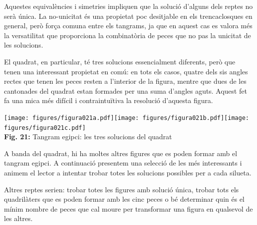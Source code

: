 \documentclass[a4paper,11pt]{article}
\begin{document}
\begin{multicols}{2}
            Aquestes equivalències i simetries impliquen que la solució d'alguns dels reptes no serà única. La no-unicitat és una propietat poc desitjable en els trencaclosques en general, però força comuna entre els tangrams, ja que en aquest cas es valora més la versatilitat que proporciona la combinatòria de peces que no pas la unicitat de les solucions.

            El quadrat, en particular, té tres solucions essencialment diferents, però que tenen una interessant propietat en comú: en tots els casos, quatre dels sis angles rectes que tenen les peces resten a l'interior de la figura, mentre que dues de les cantonades del quadrat estan formades per una suma d'angles aguts. Aquest fet fa una mica més difícil i contraintuïtiva la resolució d'aquesta figura.

            \begin{center}
                \texttt{[image: figures/figura021a.pdf]}\quad\texttt{[image: figures/figura021b.pdf]}\quad\texttt{[image: figures/figura021c.pdf]} \\
                \footnotesize{\textbf{Fig. 21:} Tangram egipci: les tres solucions del quadrat}
            \end{center}

            A banda del quadrat, hi ha moltes altres figures que es poden formar amb el tangram egipci. A continuació presentem una selecció de les més interessants i animem el lector a intentar trobar totes les solucions possibles per a cada silueta.

            Altres reptes serien: trobar totes les figures amb solució única, trobar tots els quadrilàters que es poden formar amb les cinc peces o bé determinar quin és el mínim nombre de peces que cal moure per transformar una figura en qualsevol de les altres.


\end{multicols}
\end{document}
